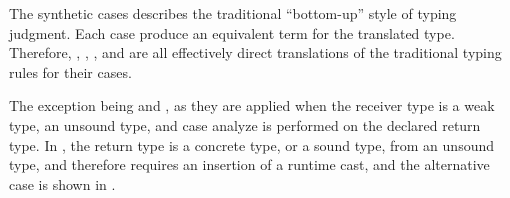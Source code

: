 \documentclass[a4paper,USenglish]{tex/lipics-v2016}
\begin{document}
\newcommand{\ba}{\xt{!}}

\begin{mathpar}





\end{mathpar}

The synthetic cases describes the traditional ``bottom-up'' style of typing judgment. Each case produce an equivalent 
\kafka term for the translated type. Therefore, , , , and  are all effectively 
direct translations of the traditional typing rules for their cases.

The exception being  and , as they are applied when the receiver type is a weak type, an unsound type, 
and case analyze is performed on the declared return type. In , the return type is a concrete type, or a sound type, 
from an unsound type, and therefore requires an insertion of a runtime cast, and the alternative case is shown in .
\end{document}
